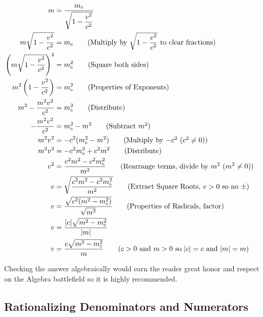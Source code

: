 \begin{ex}
\begin{enumerate}
\begin{align*}
m &  = \dfrac{m_{\text{\tiny$0$}}}{\sqrt{1 - \dfrac{v^2}{c^2}}} & \\
m \sqrt{1 - \dfrac{v^2}{c^2}} & = m_{\text{\tiny$0$}} \tag{Multiply by $\sqrt{1 - \dfrac{v^2}{c^2}}$ to clear fractions}\\ 
\left(m \sqrt{1 - \dfrac{v^2}{c^2}}\right)^{2} & = m_{\text{\tiny$0$}}^{2} \tag{Square both sides}\\ 
m^2 \left(1 - \dfrac{v^2}{c^2}\right) & =  m_{\text{\tiny$0$}}^{2} \tag{Properties of Exponents}\\
m^2 - \dfrac{m^2 v^2}{c^2} & = m_{\text{\tiny$0$}}^{2} \tag{Distribute} \\
- \dfrac{m^2 v^2}{c^2} & = m_{\text{\tiny$0$}}^{2} - m^2 \tag{Subtract $m^2$}  \\ 
m^2 v^2 & = -c^2 (m_{\text{\tiny$0$}}^{2} - m^2)  \tag{Multiply by $-c^2$ ($c^2 \neq 0$)} \\ 
m^2 v^2 & = -c^2m_{\text{\tiny$0$}}^{2} + c^2 m^2 \tag{Distribute} \\
v^2  & = \dfrac{c^2 m^2 -c^2m_{\text{\tiny$0$}}^{2}}{m^2} \tag{Rearrange terms, divide by $m^2$ ($m^2 \neq 0$)} \\
v & = \sqrt{\dfrac{c^2 m^2 -c^2m_{\text{\tiny$0$}}^{2}}{m^2}} \tag{Extract Square Roots, $v > 0$ so no $\pm$} \\
v & = \dfrac{\sqrt{c^2 (m^2 -m_{\text{\tiny$0$}}^{2})}}{\sqrt{m^2}} \tag{Properties of Radicals, factor} \\
v & = \dfrac{|c|\sqrt{m^2 -m_{\text{\tiny$0$}}^{2}}}{|m|} &  \\
v & = \dfrac{c\sqrt{m^2 -m_{\text{\tiny$0$}}^{2}}}{m} \tag{$c > 0$ and $m > 0$ so $|c| = c$ and $|m| = m$} \\
\end{align*}

Checking the answer algebraically would earn the reader great honor and respect on the Algebra battlefield so it is highly recommended.

\end{enumerate}

\end{ex}

\subsection{Rationalizing Denominators and Numerators}
\label{rationalizingdenomandnumer}

